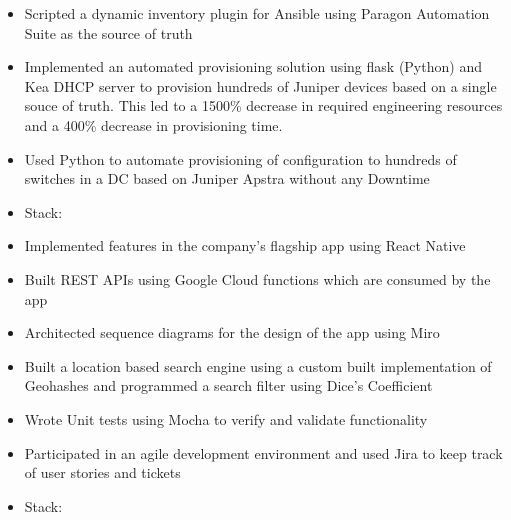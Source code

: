    

\begin{itemize}
    \item Scripted a dynamic inventory plugin for Ansible using Paragon Automation Suite as the source of truth
    \item Implemented an automated provisioning solution using flask (Python) and Kea DHCP server to provision hundreds of Juniper devices based on a single souce of truth. This led to a 1500\% decrease in required engineering resources and a 400\% decrease in provisioning time.
    \item Used Python to automate provisioning of configuration to hundreds of switches in a DC based on Juniper Apstra without any Downtime
    \item Stack:    
\end{itemize}

\divider

\begin{itemize}
    \item Implemented features in the company's flagship app using React Native
    \item Built REST APIs using Google Cloud functions which are consumed by the app
    \item Architected sequence diagrams for the design of the app using Miro
    \item Built a location based search engine using a custom built implementation of Geohashes and programmed a search filter using Dice's Coefficient
    \item Wrote Unit tests using Mocha to verify and validate functionality
    \item Participated in an agile development environment and used Jira to keep track of user stories and tickets
    \item Stack:       
\end{itemize}
\divider

